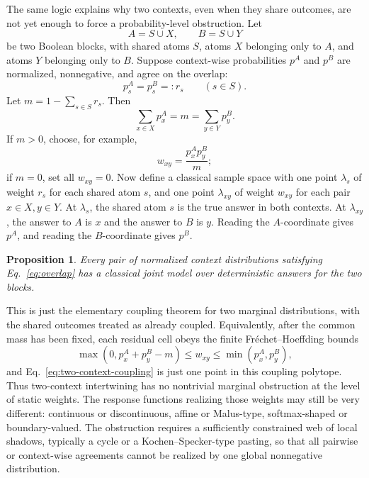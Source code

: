 \documentclass[aps,pra,reprint,superscriptaddress,nofootinbib,floatfix]{revtex4-2}
\newtheorem{proposition}{Proposition}
\begin{document}
The same logic explains why two contexts, even when they share outcomes, are
not yet enough to force a probability-level obstruction.  Let
\begin{equation}
        A=S\cup X,\qquad B=S\cup Y
\end{equation}
be two Boolean blocks, with shared atoms \(S\), atoms \(X\) belonging only to
\(A\), and atoms \(Y\) belonging only to \(B\).  Suppose context-wise
probabilities \(p^A\) and \(p^B\) are normalized, nonnegative, and agree on
the overlap:
\begin{equation}
        p^A_s=p^B_s=:r_s\qquad (s\in S).
        \label{eq:overlap}
\end{equation}
Let \(m=1-\sum_{s\in S}r_s\).  Then
\begin{equation}
        \sum_{x\in X}p^A_x=m=\sum_{y\in Y}p^B_y .
\end{equation}
If \(m>0\), choose, for example,
\begin{equation}
        w_{xy}=\frac{p^A_x p^B_y}{m};
        \label{eq:two-context-coupling}
\end{equation}
if \(m=0\), set all \(w_{xy}=0\).  Now define a classical sample space with
one point \(\lambda_s\) of weight \(r_s\) for each shared atom \(s\), and one
point \(\lambda_{xy}\) of weight \(w_{xy}\) for each pair
\(x\in X,y\in Y\).  At \(\lambda_s\), the shared atom \(s\) is the true answer
in both contexts.  At \(\lambda_{xy}\), the answer to \(A\) is \(x\) and the
answer to \(B\) is \(y\).  Reading the \(A\)-coordinate gives \(p^A\), and
reading the \(B\)-coordinate gives \(p^B\).

\begin{proposition}
Every pair of normalized context distributions satisfying
Eq.~\eqref{eq:overlap} has a classical joint model over deterministic answers
for the two blocks.
\end{proposition}

This is just the elementary coupling theorem for two marginal distributions,
with the shared outcomes treated as already coupled.  Equivalently, after the
common mass has been fixed, each residual cell obeys the finite
Fr\'echet--Hoeffding bounds
\begin{equation}
        \max(0,p^A_x+p^B_y-m)
        \le w_{xy}\le
        \min(p^A_x,p^B_y),
        \label{eq:frechet-hoeffding}
\end{equation}
and Eq.~\eqref{eq:two-context-coupling} is just one point in this coupling
polytope.  Thus two-context intertwining has no nontrivial marginal
obstruction at the level of static weights.  The response functions realizing
those weights may still be very different: continuous or discontinuous,
affine or Malus-type, softmax-shaped or boundary-valued.  The obstruction
requires a sufficiently constrained web of local shadows, typically a cycle
or a Kochen--Specker-type pasting, so that all pairwise or context-wise
agreements cannot be realized by one global nonnegative distribution.
\end{document}
